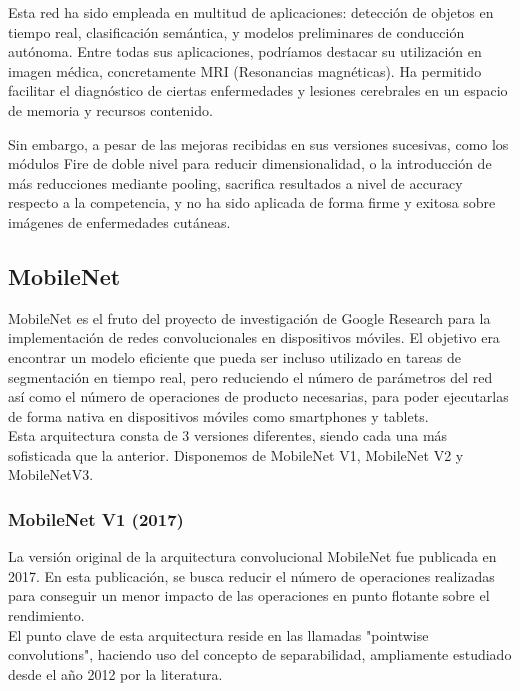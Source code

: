 Esta red ha sido empleada en multitud de aplicaciones: detección de objetos en tiempo real, clasificación semántica, y modelos preliminares de conducción autónoma. Entre todas sus aplicaciones, podríamos destacar su utilización en imagen médica, concretamente MRI (Resonancias magnéticas). Ha permitido facilitar el diagnóstico de ciertas enfermedades y lesiones cerebrales en un espacio de memoria y recursos contenido.

Sin embargo, a pesar de las mejoras recibidas en sus versiones sucesivas, como los módulos Fire de doble nivel para reducir dimensionalidad, o la introducción de más reducciones mediante pooling, sacrifica resultados a nivel de accuracy respecto a la competencia, y no ha sido aplicada de forma firme y exitosa sobre imágenes de enfermedades cutáneas.



\subsection{MobileNet}
\label{cap:mobile}

MobileNet es el fruto del proyecto de investigación de Google Research para la implementación de redes convolucionales en dispositivos móviles. El objetivo era encontrar un modelo eficiente que pueda ser incluso utilizado en tareas de segmentación en tiempo real, pero reduciendo el número de parámetros del red así como el número de operaciones de producto necesarias, para poder ejecutarlas de forma nativa en dispositivos móviles como smartphones y tablets.\\

Esta arquitectura consta de 3 versiones diferentes, siendo cada una más sofisticada que la anterior. Disponemos de MobileNet V1, MobileNet V2 y MobileNetV3.

\subsubsection{MobileNet V1 (2017)}

La versión original de la arquitectura convolucional MobileNet  \cite{howard2017mobilenets} fue publicada en 2017. En esta publicación, se busca reducir el número de operaciones realizadas para conseguir un menor impacto de las operaciones en punto flotante sobre el rendimiento.\\
El punto clave de esta arquitectura reside en las llamadas "pointwise convolutions", haciendo uso del concepto de separabilidad, ampliamente estudiado desde el año 2012 por la literatura.

